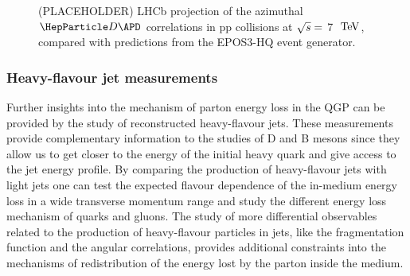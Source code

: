 \begin{figure}
\centering
{}
\caption{(PLACEHOLDER) LHCb projection of the azimuthal $\PD \APD$ correlations in pp collisions at $\sqrt{s}=$ 7 $~\text{TeV}$, compared with predictions from the EPOS3-HQ event generator.}
\label{fig:DD}
\end {figure}


\subsubsection{Heavy-flavour jet measurements}
Further insights into the mechanism of parton energy loss in the QGP can be provided by the study of reconstructed heavy-flavour jets. These measurements provide complementary information to the studies of D and B mesons since they allow us to get closer to the energy of the initial heavy quark and give access to the jet energy profile. By comparing the production of heavy-flavour jets with light jets one can test the expected flavour dependence of the in-medium energy loss in a wide transverse momentum range and study the different energy loss mechanism of quarks and gluons. The study of more differential observables related to the production of heavy-flavour particles in jets, like the fragmentation function and the angular correlations, provides additional constraints into the mechanisms of redistribution of the energy lost by the parton inside the medium. %


